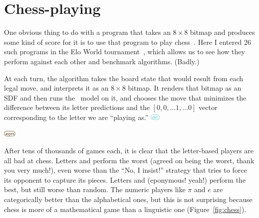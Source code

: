 \documentclass[twocolumn]{article}
\begin{document}


\section{Chess-playing}

\newcommand\deterministic{
  \includegraphics[height=0.8em]{deterministic}
}
\newcommand\asymmetric{
  \includegraphics[height=0.8em]{asymmetric}
}


One obvious thing to do with a program that takes an $8 \times 8$
bitmap and produces some kind of score for it is to use that
program to play chess~\cite{murphy2019blind}. Here I entered
26 such programs in the Elo World tournament~\cite{murphy2019eloworld},
which allows us to see how they perform against each other
and benchmark algorithms. (Badly.)

At each turn, the algorithm takes the board state that would
result from each legal move, and interprets it as an $8 \times 8$
bitmap. It renders that bitmap as an SDF and then runs the
\makelowercase\ model on it, and chooses the move that minimizes
the difference between its letter predictions and the
$[0, 0, \ldots 1, \ldots 0]$ vector corresponding to the letter
we are ``playing as.'' \deterministic \asymmetric

After tens of thousands of games each, it is clear that the letter-based
players are all bad at chess. Letters  and
 perform the worst (agreed on  being the
worst, thank you very much!), even worse than the ``No, I insist!''
strategy that tries to force its opponent to capture its pieces.
Letters  and  (eponymous! yeah!) perform
the best, but still worse than random. The numeric players like $\pi$
and $e$ are categorically better than the alphabetical ones, but this
is not surprising because chess is more of a mathematical game than a
linguistic one (Figure~\ref{fig:chess}).
\end{document}
